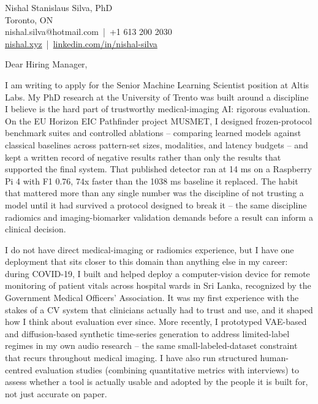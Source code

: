 \documentclass[11pt]{article}
\begin{document}
\pagestyle{empty}

\begin{flushleft}
Nishal Stanislaus Silva, PhD \\
Toronto, ON \\
nishal.silva@hotmail.com \,|\, +1 613 200 2030 \\
\href{https://nishal.xyz}{nishal.xyz} \,|\, \href{https://www.linkedin.com/in/nishal-silva}{linkedin.com/in/nishal-silva}
\end{flushleft}

\vspace{1em}

Dear Hiring Manager,

I am writing to apply for the Senior Machine Learning Scientist position at Altis Labs. My PhD research at the University of Trento was built around a discipline I believe is the hard part of trustworthy medical-imaging AI: rigorous evaluation. On the EU Horizon EIC Pathfinder project MUSMET, I designed frozen-protocol benchmark suites and controlled ablations -- comparing learned models against classical baselines across pattern-set sizes, modalities, and latency budgets -- and kept a written record of negative results rather than only the results that supported the final system. That published detector ran at 14 ms on a Raspberry Pi 4 with F1 0.76, 74x faster than the 1038 ms baseline it replaced. The habit that mattered more than any single number was the discipline of not trusting a model until it had survived a protocol designed to break it -- the same discipline radiomics and imaging-biomarker validation demands before a result can inform a clinical decision.

I do not have direct medical-imaging or radiomics experience, but I have one deployment that sits closer to this domain than anything else in my career: during COVID-19, I built and helped deploy a computer-vision device for remote monitoring of patient vitals across hospital wards in Sri Lanka, recognized by the Government Medical Officers' Association. It was my first experience with the stakes of a CV system that clinicians actually had to trust and use, and it shaped how I think about evaluation ever since. More recently, I prototyped VAE-based and diffusion-based synthetic time-series generation to address limited-label regimes in my own audio research -- the same small-labeled-dataset constraint that recurs throughout medical imaging. I have also run structured human-centred evaluation studies (combining quantitative metrics with interviews) to assess whether a tool is actually usable and adopted by the people it is built for, not just accurate on paper.
\end{document}
